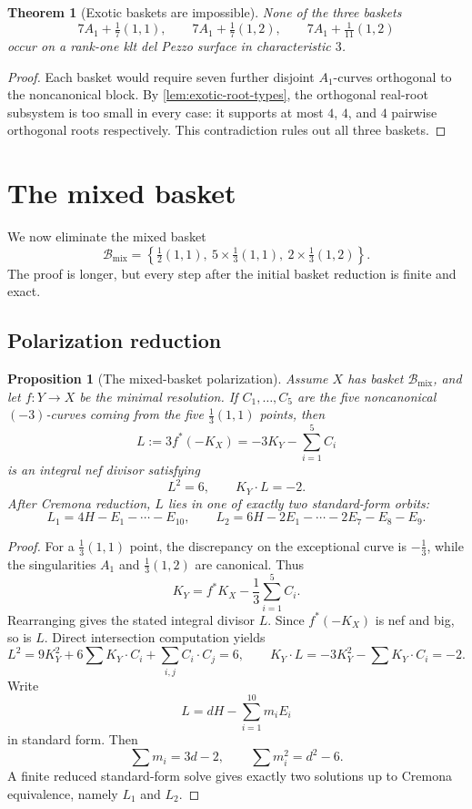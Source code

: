 \documentclass[11pt]{article}
\newtheorem{theorem}{Theorem}[section]
\newtheorem{proposition}[proposition]{Proposition}
\theoremstyle{definition}
\begin{document}
\begin{theorem}[Exotic baskets are impossible]\label{thm:exotic}
None of the three baskets
\[
7A_1+\tfrac17(1,1),\qquad 7A_1+\tfrac17(1,2),\qquad 7A_1+\tfrac1{11}(1,2)
\]
occur on a rank-one klt del Pezzo surface in characteristic $3$.
\end{theorem}

\begin{proof}
Each basket would require seven further disjoint $A_1$-curves orthogonal to the noncanonical block. By \cref{lem:exotic-root-types}, the orthogonal real-root subsystem is too small in every case: it supports at most $4$, $4$, and $4$ pairwise orthogonal roots respectively. This contradiction rules out all three baskets.
\end{proof}

\section{The mixed basket}\label{sec:mixed}
We now eliminate the mixed basket
\[
\mathcal B_{\mathrm{mix}}=\left\{\tfrac12(1,1),\ 5\times\tfrac13(1,1),\ 2\times\tfrac13(1,2)\right\}.
\]
The proof is longer, but every step after the initial basket reduction is finite and exact.

\subsection{Polarization reduction}

\begin{proposition}[The mixed-basket polarization]\label{prop:mixed-polarization}
Assume $X$ has basket $\mathcal B_{\mathrm{mix}}$, and let $f\colon Y\to X$ be the minimal resolution. If $C_1,\dots,C_5$ are the five noncanonical $(-3)$-curves coming from the five $\frac13(1,1)$ points, then
\[
L:=3f^*(-K_X)=-3K_Y-\sum_{i=1}^5C_i
\]
is an integral nef divisor satisfying
\[
L^2=6,\qquad K_Y\cdot L=-2.
\]
After Cremona reduction, $L$ lies in one of exactly two standard-form orbits:
\[
L_1=4H-E_1-\cdots-E_{10},
\qquad
L_2=6H-2E_1-\cdots-2E_7-E_8-E_9.
\]
\end{proposition}

\begin{proof}
For a $\frac13(1,1)$ point, the discrepancy on the exceptional curve is $-\frac13$, while the singularities $A_1$ and $\frac13(1,2)$ are canonical. Thus
\[
K_Y=f^*K_X-\frac13\sum_{i=1}^5C_i.
\]
Rearranging gives the stated integral divisor $L$. Since $f^*(-K_X)$ is nef and big, so is $L$. Direct intersection computation yields
\[
L^2=9K_Y^2+6\sum K_Y\cdot C_i+\sum_{i,j}C_i\cdot C_j=6,
\qquad
K_Y\cdot L=-3K_Y^2-\sum K_Y\cdot C_i=-2.
\]
Write
\[
L=dH-\sum_{i=1}^{10}m_iE_i
\]
in standard form. Then
\[
\sum m_i=3d-2,
\qquad
\sum m_i^2=d^2-6.
\]
A finite reduced standard-form solve gives exactly two solutions up to Cremona equivalence, namely $L_1$ and $L_2$.
\end{proof}
\end{document}
